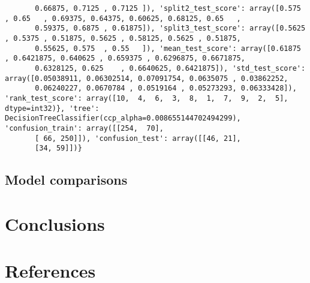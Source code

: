 \documentclass[11pt]{article}
\begin{document}
\begin{verbatim}
       0.66875, 0.7125 , 0.7125 ]), 'split2_test_score': array([0.575  , 0.65   , 0.69375, 0.64375, 0.60625, 0.68125, 0.65   ,
       0.59375, 0.6875 , 0.61875]), 'split3_test_score': array([0.5625 , 0.5375 , 0.51875, 0.5625 , 0.58125, 0.5625 , 0.51875,
       0.55625, 0.575  , 0.55   ]), 'mean_test_score': array([0.61875  , 0.6421875, 0.640625 , 0.659375 , 0.6296875, 0.6671875,
       0.6328125, 0.625    , 0.6640625, 0.6421875]), 'std_test_score': array([0.05038911, 0.06302514, 0.07091754, 0.0635075 , 0.03862252,
       0.06240227, 0.0670784 , 0.0519164 , 0.05273293, 0.06333428]), 'rank_test_score': array([10,  4,  6,  3,  8,  1,  7,  9,  2,  5], dtype=int32)}, 'tree': DecisionTreeClassifier(ccp_alpha=0.008655144702494299), 'confusion_train': array([[254,  70],
       [ 66, 250]]), 'confusion_test': array([[46, 21],
       [34, 59]])}
\end{verbatim}
\subsection{Model comparisons}
\label{sec:org28c38d2}

\section{Conclusions}
\label{sec:org0d3f879}

\section{References}
\label{sec:org3436a3d}


\end{document}
